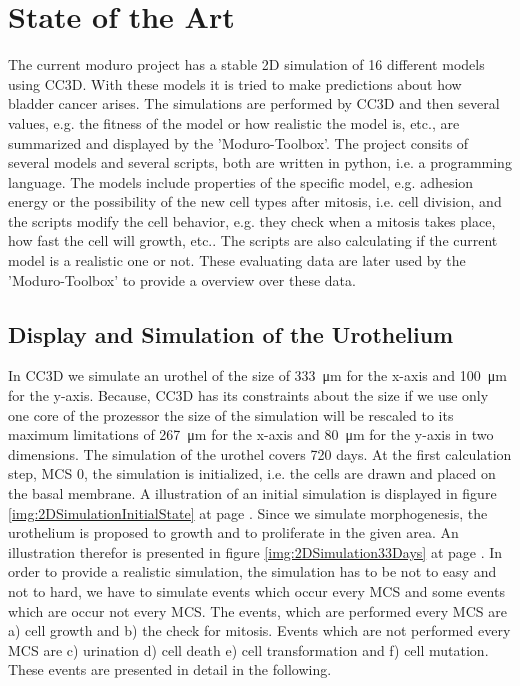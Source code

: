 \chapter{State of the Art}
The current moduro project has a stable 2D simulation of 16 different models using \ac{CC3D}. With these models it is tried to make predictions about how bladder cancer arises. The simulations are performed by \ac{CC3D} and then several values, e.g. the fitness of the model or how realistic the model is, etc., are summarized and displayed by the 'Moduro-Toolbox'. The project consits of several models and several scripts, both are written in python, i.e. a programming language. The models include properties of the specific model, e.g. adhesion energy or the possibility of the new cell types after mitosis, i.e. cell division, and the scripts modify the cell behavior, e.g. they check when a mitosis takes place, how fast the cell will growth, etc.. The scripts are also calculating if the current model is a realistic one or not. These evaluating data are later used by the 'Moduro-Toolbox' to provide a overview over these data.

\section{Display and Simulation of the Urothelium}
In \ac{CC3D} we simulate an urothel of the size of \SI{333}{\micro\metre} for the x-axis and \SI{100}{\micro\metre} for the y-axis. Because, \ac{CC3D} has its constraints about the size if we use only one core of the prozessor the size of the simulation will be rescaled to its maximum limitations of \SI{267}{\micro\metre} for the x-axis and \SI{80}{\micro\metre} for the y-axis in two dimensions. \newline 
The simulation of the urothel covers 720 days. At the first calculation step, \ac{MCS} 0, the simulation is initialized, i.e. the cells are drawn and placed on the basal membrane. A illustration of an initial simulation is displayed in figure \ref{img:2DSimulationInitialState} at page \pageref{img:2DSimulationInitialState}. Since we simulate morphogenesis, the urothelium is proposed to growth and to proliferate in the given area. An illustration therefor is presented in figure \ref{img:2DSimulation33Days} at page \pageref{img:2DSimulation33Days}. \newline
In order to provide a realistic simulation, the simulation has to be not to easy and not to hard, we have to simulate events which occur every \ac{MCS} and some events which are occur not every \ac{MCS}. The events, which are performed every \ac{MCS} are a) cell growth and b) the check for mitosis. Events which are not performed every \ac{MCS} are c) urination d) cell death e) cell transformation and f) cell mutation. These events are presented in detail in the following.

